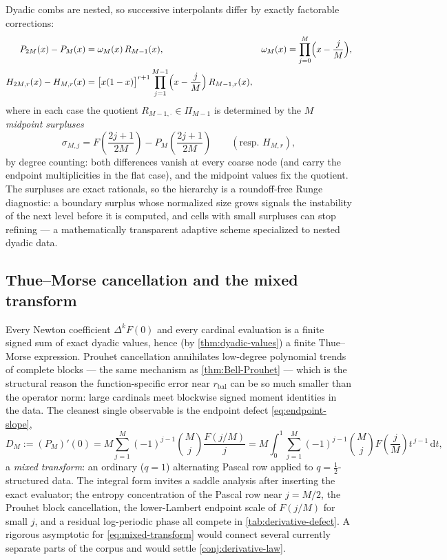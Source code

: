 \documentclass[11pt,oneside]{article}
\numberwithin{equation}{section}
\theoremstyle{definition}
\theoremstyle{remark}
\newcommand{\dd}{\,\mathrm d}
\begin{document}
Dyadic combs are nested, so successive interpolants differ by exactly
factorable corrections:
\begin{align}
 P_{2M}(x)-P_{M}(x)
 &=\omega_M(x)\,R_{M-1}(x),
 &\omega_M(x)&=\prod_{j=0}^{M}\Bigl(x-\frac jM\Bigr),
 \label{eq:nested-ordinary}\\
 H_{2M,r}(x)-H_{M,r}(x)
 &=\bigl[x(1-x)\bigr]^{r+1}
 \prod_{j=1}^{M-1}\Bigl(x-\frac jM\Bigr)\,R_{M-1,r}(x),
 \label{eq:nested-flat}
\end{align}
where in each case the quotient $R_{M-1,\cdot}\in\Pi_{M-1}$ is
determined by the $M$ \emph{midpoint surpluses}
\begin{equation}
 \sigma_{M,j}
 =F\!\left(\frac{2j+1}{2M}\right)
 -P_{M}\!\left(\frac{2j+1}{2M}\right)
 \qquad(\text{resp.\ }H_{M,r}),
 \label{eq:midpoint-surplus}
\end{equation}
by degree counting: both differences vanish at every coarse node (and
carry the endpoint multiplicities in the flat case), and the midpoint
values fix the quotient.  The surpluses are exact rationals, so the
hierarchy is a roundoff-free Runge diagnostic: a boundary surplus
whose normalized size grows signals the instability of the next level
before it is computed, and cells with small surpluses can stop
refining --- a mathematically transparent adaptive scheme specialized
to nested dyadic data.

\subsection{Thue--Morse cancellation and the mixed transform}

Every Newton coefficient $\Delta^{k}F(0)$ and every cardinal
evaluation is a finite signed sum of exact dyadic values, hence (by
\cref{thm:dyadic-values}) a finite Thue--Morse expression.  Prouhet
cancellation annihilates low-degree polynomial trends of complete
blocks --- the same mechanism as \cref{thm:Bell-Prouhet} --- which is
the structural reason the function-specific error near
$r_{\mathrm{bal}}$ can be so much smaller than the operator norm:
large cardinals meet blockwise signed moment identities in the data.
The cleanest single observable is the endpoint defect
\eqref{eq:endpoint-slope},
\begin{equation}
 D_M:=(P_M)'(0)
 =M\sum_{j=1}^{M}(-1)^{j-1}\binom Mj\frac{F(j/M)}{j}
 =M\int_0^1\sum_{j=1}^{M}(-1)^{j-1}\binom Mj
 F\!\left(\frac jM\right)t^{\,j-1}\dd t,
 \label{eq:mixed-transform}
\end{equation}
a \emph{mixed transform}: an ordinary ($q{=}1$) alternating Pascal row
applied to $q{=}\tfrac12$-structured data.  The integral form invites
a saddle analysis after inserting the exact evaluator; the entropy
concentration of the Pascal row near $j=M/2$, the Prouhet block
cancellation, the lower-Lambert endpoint scale of $F(j/M)$ for small
$j$, and a residual log-periodic phase all compete in
\cref{tab:derivative-defect}.  A rigorous asymptotic for
\eqref{eq:mixed-transform} would connect several currently separate
parts of the corpus and would settle
\cref{conj:derivative-law}.
\end{document}
